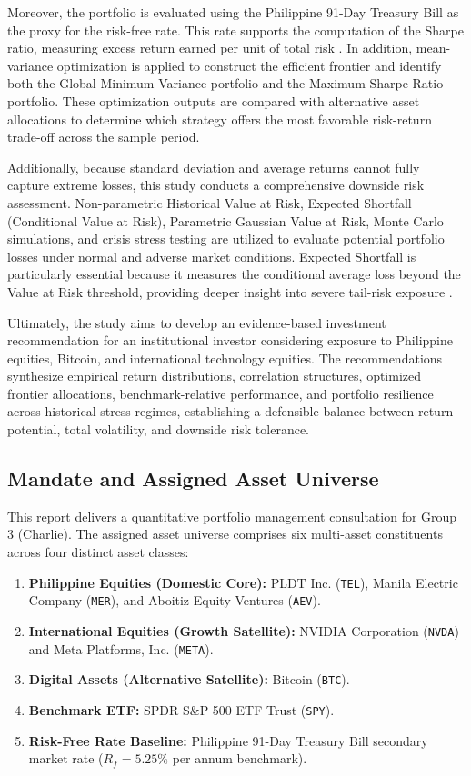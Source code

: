 Moreover, the portfolio is evaluated using the Philippine 91-Day Treasury Bill as the proxy for the risk-free rate. This rate supports the computation of the Sharpe ratio, measuring excess return earned per unit of total risk \parencite{sharpe1966}. In addition, mean-variance optimization is applied to construct the efficient frontier and identify both the Global Minimum Variance portfolio and the Maximum Sharpe Ratio portfolio. These optimization outputs are compared with alternative asset allocations to determine which strategy offers the most favorable risk-return trade-off across the sample period.

Additionally, because standard deviation and average returns cannot fully capture extreme losses, this study conducts a comprehensive downside risk assessment. Non-parametric Historical Value at Risk, Expected Shortfall (Conditional Value at Risk), Parametric Gaussian Value at Risk, Monte Carlo simulations, and crisis stress testing are utilized to evaluate potential portfolio losses under normal and adverse market conditions. Expected Shortfall is particularly essential because it measures the conditional average loss beyond the Value at Risk threshold, providing deeper insight into severe tail-risk exposure \parencite{acerbi2002}.

Ultimately, the study aims to develop an evidence-based investment recommendation for an institutional investor considering exposure to Philippine equities, Bitcoin, and international technology equities. The recommendations synthesize empirical return distributions, correlation structures, optimized frontier allocations, benchmark-relative performance, and portfolio resilience across historical stress regimes, establishing a defensible balance between return potential, total volatility, and downside risk tolerance.

\subsection{Mandate and Assigned Asset Universe}

This report delivers a quantitative portfolio management consultation for Group 3 (Charlie). The assigned asset universe comprises six multi-asset constituents across four distinct asset classes:

\begin{enumerate}
  \item \textbf{Philippine Equities (Domestic Core):} PLDT Inc. (\texttt{TEL}), Manila Electric Company (\texttt{MER}), and Aboitiz Equity Ventures (\texttt{AEV}).
  \item \textbf{International Equities (Growth Satellite):} NVIDIA Corporation (\texttt{NVDA}) and Meta Platforms, Inc. (\texttt{META}).
  \item \textbf{Digital Assets (Alternative Satellite):} Bitcoin (\texttt{BTC}).
  \item \textbf{Benchmark ETF:} SPDR S\&P 500 ETF Trust (\texttt{SPY}).
  \item \textbf{Risk-Free Rate Baseline:} Philippine 91-Day Treasury Bill secondary market rate ($R_f = 5.25\%$ per annum benchmark).
\end{enumerate}

